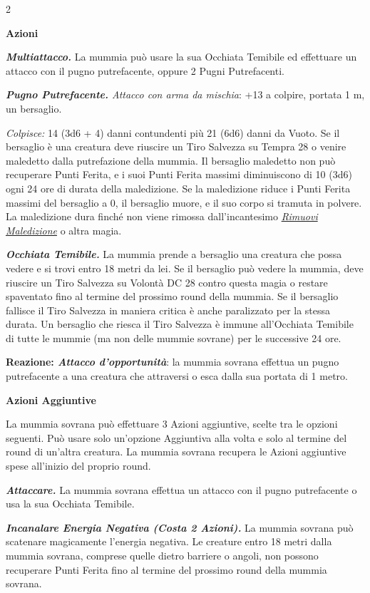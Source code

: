 \begin{multicols}{2}
{\textbf{Azioni}

\emph{\textbf{Multiattacco.}} La mummia può usare la sua Occhiata Temibile ed effettuare un attacco con il pugno putrefacente, oppure 2 Pugni Putrefacenti.

\emph{\textbf{Pugno Putrefacente.} Attacco con arma da mischia}: +13 a colpire, portata 1 m, un bersaglio.

\emph{Colpisce:} 14 (3d6 + 4) danni contundenti più 21 (6d6) danni da Vuoto. Se il bersaglio è una creatura deve riuscire un Tiro Salvezza su Tempra 28 o venire maledetto dalla putrefazione della mummia. Il bersaglio maledetto non può recuperare Punti Ferita, e i suoi Punti Ferita massimi diminuiscono di 10 (3d6) ogni 24 ore di durata della maledizione. Se la maledizione riduce i Punti Ferita massimi del bersaglio a 0, il bersaglio muore, e il suo corpo si tramuta in polvere. La maledizione dura finché non viene rimossa dall'incantesimo \emph{\hyperlink{Rimuovi Maledizione}{Rimuovi Maledizione}} o altra magia.

\emph{\textbf{Occhiata Temibile.}} La mummia prende a bersaglio una creatura che possa vedere e si trovi entro 18 metri da lei. Se il bersaglio può vedere la mummia, deve riuscire un Tiro Salvezza su Volontà DC 28 contro questa magia o restare spaventato fino al termine del prossimo round della mummia. Se il bersaglio fallisce il Tiro Salvezza in maniera critica è anche paralizzato per la stessa durata. Un bersaglio che riesca il Tiro Salvezza è immune all'Occhiata Temibile di tutte le mummie (ma non delle mummie sovrane) per le successive 24 ore.

\textbf{Reazione: \emph{Attacco d'opportunità}}: la mummia sovrana effettua un pugno putrefacente a una creatura che attraversi o esca dalla sua portata di 1 metro.

\textbf{Azioni Aggiuntive}

La mummia sovrana può effettuare 3 Azioni aggiuntive, scelte tra le opzioni seguenti. Può usare solo un'opzione Aggiuntiva alla volta e solo al termine del round di un'altra creatura. La mummia sovrana recupera le Azioni aggiuntive spese all'inizio del proprio round.

\emph{\textbf{Attaccare.}} La mummia sovrana effettua un attacco con il pugno putrefacente o usa la sua Occhiata Temibile.

\emph{\textbf{Incanalare Energia Negativa (Costa 2 Azioni).}} La mummia sovrana può scatenare magicamente l'energia negativa. Le creature entro 18 metri dalla mummia sovrana, comprese quelle dietro barriere o angoli, non possono recuperare Punti Ferita fino al termine del prossimo round della mummia sovrana.

}
\end{multicols}

